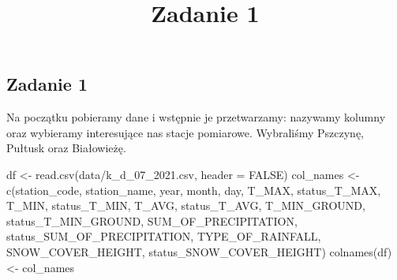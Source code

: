 \documentclass[
]{article}
\title{Zadanie 1}
\author{}
\date{\vspace{-2.5em}}
\newenvironment{Shaded}{\begin{snugshade}}{\end{snugshade}}
\newcommand{\AttributeTok}[1]{\textcolor[rgb]{0.77,0.63,0.00}{#1}}
\newcommand{\ConstantTok}[1]{\textcolor[rgb]{0.00,0.00,0.00}{#1}}
\newcommand{\FunctionTok}[1]{\textcolor[rgb]{0.00,0.00,0.00}{#1}}
\newcommand{\NormalTok}[1]{#1}
\newcommand{\OtherTok}[1]{\textcolor[rgb]{0.56,0.35,0.01}{#1}}
\newcommand{\StringTok}[1]{\textcolor[rgb]{0.31,0.60,0.02}{#1}}
\begin{document}
\maketitle

\hypertarget{zadanie-1}{%
\subsection{Zadanie 1}\label{zadanie-1}}

Na początku pobieramy dane i wstępnie je przetwarzamy: nazywamy kolumny
oraz wybieramy interesujące nas stacje pomiarowe. Wybraliśmy Pszczynę,
Pułtusk oraz Białowieżę.

\begin{Shaded}
\begin{Highlighting}[]
\NormalTok{df }\OtherTok{\textless{}{-}} \FunctionTok{read.csv}\NormalTok{(}\StringTok{\textquotesingle{}data/k\_d\_07\_2021.csv\textquotesingle{}}\NormalTok{, }\AttributeTok{header =} \ConstantTok{FALSE}\NormalTok{)}
\NormalTok{col\_names }\OtherTok{\textless{}{-}} \FunctionTok{c}\NormalTok{(}\StringTok{\textquotesingle{}station\_code\textquotesingle{}}\NormalTok{, }\StringTok{\textquotesingle{}station\_name\textquotesingle{}}\NormalTok{, }\StringTok{\textquotesingle{}year\textquotesingle{}}\NormalTok{, }\StringTok{\textquotesingle{}month\textquotesingle{}}\NormalTok{, }\StringTok{\textquotesingle{}day\textquotesingle{}}\NormalTok{, }
               \StringTok{\textquotesingle{}T\_MAX\textquotesingle{}}\NormalTok{, }\StringTok{\textquotesingle{}status\_T\_MAX\textquotesingle{}}\NormalTok{, }\StringTok{\textquotesingle{}T\_MIN\textquotesingle{}}\NormalTok{, }\StringTok{\textquotesingle{}status\_T\_MIN\textquotesingle{}}\NormalTok{, }\StringTok{\textquotesingle{}T\_AVG\textquotesingle{}}\NormalTok{, }\StringTok{\textquotesingle{}status\_T\_AVG\textquotesingle{}}\NormalTok{,}
               \StringTok{\textquotesingle{}T\_MIN\_GROUND\textquotesingle{}}\NormalTok{, }\StringTok{\textquotesingle{}status\_T\_MIN\_GROUND\textquotesingle{}}\NormalTok{, }\StringTok{\textquotesingle{}SUM\_OF\_PRECIPITATION\textquotesingle{}}\NormalTok{, }\StringTok{\textquotesingle{}status\_SUM\_OF\_PRECIPITATION\textquotesingle{}}\NormalTok{,}
               \StringTok{\textquotesingle{}TYPE\_OF\_RAINFALL\textquotesingle{}}\NormalTok{, }\StringTok{\textquotesingle{}SNOW\_COVER\_HEIGHT\textquotesingle{}}\NormalTok{, }\StringTok{\textquotesingle{}status\_SNOW\_COVER\_HEIGHT\textquotesingle{}}\NormalTok{)}
\FunctionTok{colnames}\NormalTok{(df) }\OtherTok{\textless{}{-}}\NormalTok{ col\_names}


\end{Highlighting}
\end{Shaded}
\end{document}
